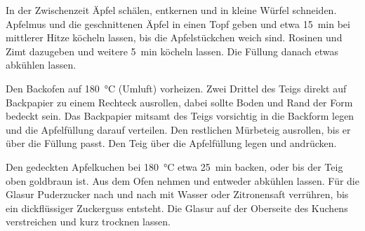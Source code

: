 \begin{recipeDP}
{        \step In der Zwischenzeit Äpfel schälen, entkernen und in kleine Würfel schneiden.
        Apfelmus und die geschnittenen Äpfel in einen Topf geben und etwa \SI[]{15}{\minute} bei mittlerer Hitze köcheln lassen, bis die Apfelstückchen weich sind.
        Rosinen und Zimt dazugeben und weitere \SI[]{5}{\minute} köcheln lassen.
        Die Füllung danach etwas abkühlen lassen.

        \step Den Backofen auf \SI{180}{\celsius} (Umluft) vorheizen.
        Zwei Drittel des Teigs direkt auf Backpapier zu einem Rechteck ausrollen, dabei sollte Boden und Rand der Form bedeckt sein.
        Das Backpapier mitsamt des Teigs vorsichtig in die Backform legen und die Apfelfüllung darauf verteilen.
        Den restlichen Mürbeteig ausrollen, bis er über die Füllung passt.
        Den Teig über die Apfelfüllung legen und andrücken.

        \step Den gedeckten Apfelkuchen bei \SI{180}{\celsius} etwa \SI[]{25}{\minute} backen, oder bis der Teig oben goldbraun ist.
        Aus dem Ofen nehmen und entweder abkühlen lassen.
        Für die Glasur Puderzucker nach und nach mit Wasser oder Zitronensaft verrühren, bis ein dickflüssiger Zuckerguss entsteht.
        Die Glasur auf der Oberseite des Kuchens verstreichen und kurz trocknen lassen.
    }



\end{recipeDP}